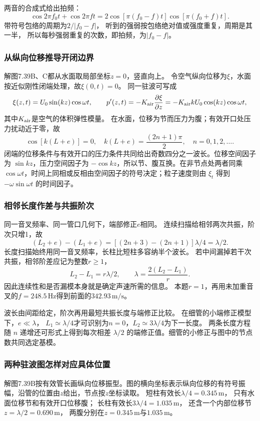 \documentclass[UTF8,fontset=fandol,a4paper,11pt]{ctexart}
\begin{document}
两音的合成式给出拍频：
\[
\cos2\pi f_0t+\cos2\pi ft
=2\cos[\pi(f_0-f)t]\cos[\pi(f_0+f)t].
\]
带符号包络的周期为$2/|f_0-f|$，
听到的强弱按包络绝对值或强度重复，周期是其一半，
所以每秒强弱重复的次数，即拍频，为$|f_0-f|$。

\subsubsection*{从纵向位移推导开闭边界}
解图7.39B、C都从水面取局部坐标$z=0$，竖直向上。
令空气纵向位移为$\xi$，水面按近似刚性闭端处理，故$\xi(0,t)=0$。
同一驻波可写成
\[
\xi(z,t)=U_0\sin(kz)\cos\omega t,\qquad
p'(z,t)=-K_{\rm air}\frac{\partial\xi}{\partial z}
=-K_{\rm air}kU_0\cos(kz)\cos\omega t,
\]
其中$K_{\rm air}$是空气的体积弹性模量。
在水面，位移为节而压力为腹；有效开口处压力扰动近于零，故
\[
\cos[k(L+e)]=0,\quad
k(L+e)=\frac{(2n+1)\pi}{2},\quad n=0,1,2,\ldots.
\]
闭端的位移条件与有效开口的压力条件共同给出奇数四分之一波长。位移空间因子为 $\sin kz$，压力空间因子为 $-\cos kz$，所以节、腹互换。在非节点处两者同乘 $\cos\omega t$，时间上同相或反相由空间因子的符号决定；粒子速度则由 $\xi_t$ 得到 $-\omega\sin\omega t$ 的时间因子。

\subsubsection*{相邻长度作差与共振阶次}
同一音叉频率、同一管口几何下，端部修正$e$相同。
连续扫描给相邻两次共振，阶次只增1，故
\[
(L_2+e)-(L_1+e)
=[(2n+3)-(2n+1)]\lambda/4=\lambda/2.
\]
长度扫描始终用同一音叉频率，长柱比短柱多容纳半个波长。
若中间漏掉若干次共振，相邻阶差应记为整数$r\ge1$，
\[
L_2-L_1=r\lambda/2,\qquad
\lambda=\frac{2(L_2-L_1)}r.
\]
因此连续性和是否漏模本身就是确定声速所需的信息。
本题$r=1$，再用未加重音叉的$f=248.5\,\mathrm{Hz}$得到前面的$342.93\,\mathrm{m/s}$。

波长由间距给定，阶次再用最短共振长度与端修正比较。
在细管的小端修正模型下，$e\ll\lambda$，
$L_1\simeq\lambda/4$才可识别为$n=0$，$L_2\simeq3\lambda/4$为下一长度。
两条长度方程随 $n$ 递增还可形式上得到每次相差 $\lambda/2$ 的端修正值。细管的小修正与图中的节点数共同选定基模。

\subsubsection*{两种驻波图怎样对应具体位置}
解图7.39B按有效管长画纵向位移振型。图的横向坐标表示纵向位移的有符号振幅，沿管的位置由$z$给出，节点按$z$坐标读取。
短柱有效长$\lambda/4=0.345\,\mathrm m$，
只有水面位移节和有效开口位移腹；
长柱有效长$3\lambda/4=1.035\,\mathrm m$，
还含一个内部位移节$z=\lambda/2=0.690\,\mathrm m$，
两腹分别在$z=0.345\,\mathrm m$与$1.035\,\mathrm m$。
\end{document}
